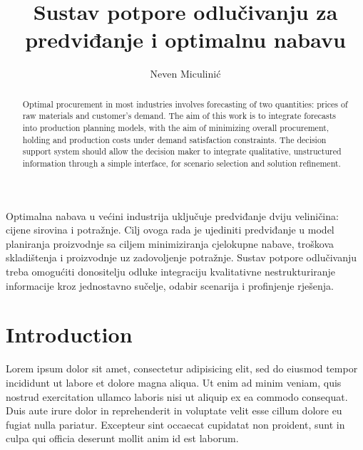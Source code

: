 \documentclass[times, utf8, seminar]{fer}
\begin{document}
\theoremstyle{definition}
\newtheorem{definition}{Definition}[section]

\title{Sustav potpore odlučivanju za predviđanje i optimalnu nabavu
}
\author{Neven Miculinić}

\maketitle
\tableofcontents

\begin{sazetak}
    Optimalna nabava u većini industrija uključuje predviđanje dviju veliničina: cijene sirovina i potražnje. Cilj ovoga rada je ujediniti predviđanje u model planiranja proizvodnje sa ciljem minimiziranja cjelokupne nabave, troškova skladištenja i proizvodnje uz zadovoljenje potražnje. Sustav potpore odlučivanju treba omogućiti donositelju odluke integraciju kvalitativne nestrukturiranje informacije kroz jednostavno sučelje, odabir scenarija i profinjenje rješenja.


\end{sazetak}

\begin{abstract}
Optimal procurement in most industries involves forecasting of two
quantities: prices of raw materials and customer's demand.  The aim of
this work is to integrate forecasts into production planning models,
with the aim of minimizing overall procurement, holding and production
costs under demand satisfaction constraints.  The decision support
system should allow the decision maker to integrate qualitative,
unstructured information through a simple interface, for scenario
selection and solution refinement.
\end{abstract}

\chapter{Introduction}
Lorem ipsum dolor sit amet, consectetur adipisicing elit, sed do eiusmod tempor incididunt ut labore et dolore magna aliqua. Ut enim ad minim veniam, quis nostrud exercitation ullamco laboris nisi ut aliquip ex ea commodo consequat. Duis aute irure dolor in reprehenderit in voluptate velit esse cillum dolore eu fugiat nulla pariatur. Excepteur sint occaecat cupidatat non proident, sunt in culpa qui officia deserunt mollit anim id est laborum.
\end{document}
